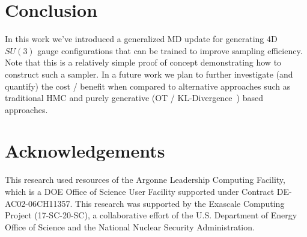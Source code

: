 \documentclass[a4paper,11pt]{article}
\begin{document}
\section{\label{sec:conclusion}Conclusion}
%
In this work we've introduced a generalized MD update for generating 4D $SU(3)$ gauge configurations that can be trained to improve sampling efficiency.
%
Note that this is a relatively simple proof of concept demonstrating how to construct such a sampler.
%
In a future work we plan to further investigate (and quantify) the cost / benefit when compared to alternative approaches such as traditional HMC and purely generative (OT / KL-Divergence~\cite{albergo_flow-based_2019,albergo_introduction_2021,boyda_sampling_2021,kanwar_equivariant_2020}) based approaches.
%
%
\section{\label{sec:acknowledgements}Acknowledgements}
This research used resources of the Argonne Leadership Computing Facility,
which is a DOE Office of Science User Facility supported under Contract DE-AC02-06CH11357.
%
This research was supported by the Exascale Computing Project (17-SC-20-SC), a collaborative effort of the U.S. Department of Energy Office of Science and the National Nuclear Security Administration.
%
%
\nocite{*}
{}



\appendix
%
\end{document}
